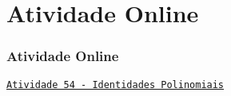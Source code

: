 \section{Atividade Online}
\begin{frame}
\frametitle{Atividade Online} 

\href{https://pt.khanacademy.org/math/algebra2/polynomial-functions/proving-polynomial-identities/e/polynomial-identities}
{{\tt Atividade 54 - Identidades Polinomiais}}



\end{frame}


